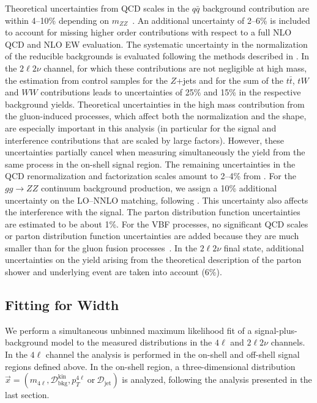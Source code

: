 Theoretical uncertainties from QCD scales in the $q\bar{q}$ background contribution are
within 4--10\% depending on $m_{ZZ}$~\cite{Chatrchyan:2013mxa}. An additional uncertainty of
2--6\% is included to account for missing higher order contributions with respect to a full NLO
QCD and NLO EW evaluation. The systematic uncertainty
in the normalization of the reducible backgrounds is evaluated following the methods
described in \cite{Chatrchyan:2013mxa,Chatrchyan:2013yoa}. In the $2\ell 2\nu$
channel, for which these contributions are not negligible at high mass, the estimation
from control samples for the $Z$+jets and for the sum of the $t\bar{t}$, $tW$
and $WW$ contributions leads to uncertainties of 25\% and 15\% in the respective background
yields. Theoretical uncertainties in the high mass contribution from the gluon-induced
processes, which affect both the normalization and the shape, are especially important
in this analysis (in particular for the signal and interference contributions that
are scaled by large factors). However, these uncertainties partially cancel when
measuring simultaneously the yield from the same process in the on-shell signal region. The
remaining uncertainties in the QCD renormalization and factorization
scales amount to 2--4\% from \cite{Passarino:2013bha}. For the $gg \to ZZ$ continuum background production, we assign
a 10\% additional uncertainty on the LO--NNLO matching, following \cite{Bonvini:2013jha}. This
uncertainty also affects the interference with the signal. The parton distribution function uncertainties are estimated to be about 1\%. For the VBF processes,
no significant QCD scales or parton distribution function uncertainties are added because they are much smaller than for the gluon fusion processes~\cite{Dittmaier:2011ti,Heinemeyer:2013tqa}.
In the $2\ell 2\nu$ final state, additional uncertainties on the yield arising from the theoretical
description of the parton shower and underlying event are taken into account (6\%).

\subsection{Fitting for Width}
\label{sec:Final_fit_width}

We perform a simultaneous unbinned maximum likelihood fit of a signal-plus-background model
to the measured distributions in the $4\ell$ and $2\ell2\nu$ channels. In the $4\ell$ channel
the analysis is performed in the on-shell and off-shell signal regions defined above. In the
on-shell region, a three-dimensional distribution
$\vec{x}= (m_{4\ell}, \mathcal{D}_\text{bkg}^\text{kin}, p_{T}^{4\ell}\ \text{or}\ \mathcal{D}_\text{jet})$
is analyzed, following the analysis presented in the last section.

